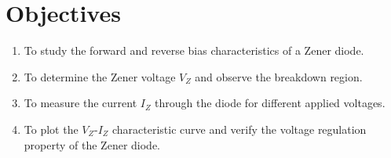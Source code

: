 \section{Objectives}
\begin{enumerate}
  \setlength{\itemsep}{0pt}
        \setlength{\parskip}{0pt}
        \setlength{\parsep}{0pt}
  \item To study the forward and reverse bias characteristics of a Zener diode.
  \item To determine the Zener voltage $V_Z$ and observe the breakdown region.
  \item To measure the current $I_Z$ through the diode for different applied voltages.
  \item To plot the $V_Z$-$I_Z$ characteristic curve and verify the voltage regulation property of the Zener diode.
\end{enumerate}
